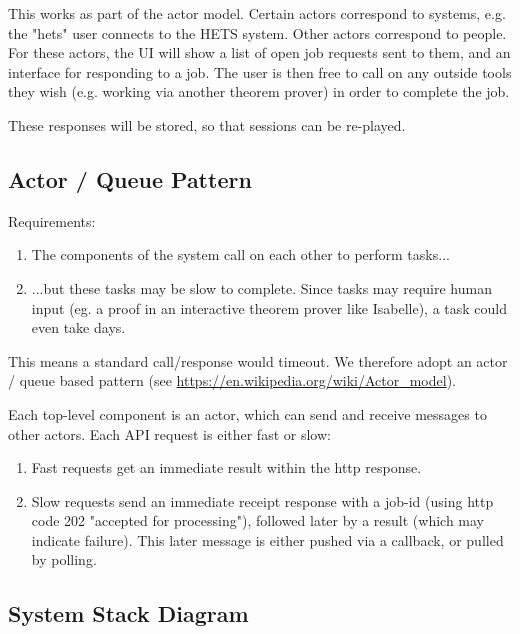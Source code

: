 \documentclass[a4paper,twoside,11pt]{article}
\begin{document}
This works as part of the actor model. Certain actors correspond to systems, e.g. the "hets" user
connects to the HETS system. Other actors correspond to people. For these actors, the UI
will show a list of open job requests sent to them, and an interface for responding to a job.
The user is then free to call on any outside tools they wish (e.g. working via another theorem prover)
in order to complete the job.

These responses will be stored, so that sessions can be re-played.

\subsection{Actor / Queue Pattern}


Requirements:  
\begin{enumerate}
\item The components of the system call on each other to perform tasks...
\item ...but these tasks may be slow to complete. Since tasks may require human input (eg. a proof in an interactive theorem prover like Isabelle), a task
could even take days.
\end{enumerate}
This means a standard call/response would timeout. We therefore adopt an actor / queue based pattern (see \url{https://en.wikipedia.org/wiki/Actor_model}). 

Each top-level component is an actor, which can send and receive messages to other actors. Each API request is either fast or slow:
\begin{enumerate}
 \item Fast requests get an immediate result within the http response.
 \item Slow requests send an immediate receipt response with a job-id (using http code 202 "accepted for processing"), followed later by a result (which may indicate failure). This later message is either pushed via a callback, or pulled by polling.
\end{enumerate}

\subsection{System Stack Diagram}
\end{document}
